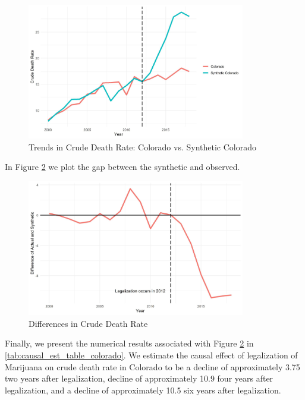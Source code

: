 \documentclass{article}
\begin{document}
\begin{figure}[H]
	\begin{center}
		\includegraphics[width=0.85\textwidth]{trends_plot_colorado}
	\end{center}
	\caption{Trends in Crude Death Rate: Colorado vs. Synthetic Colorado}
	\label{fig:trends_plot_colorado}
\end{figure}

In Figure \ref{fig:diffs_plot_colorado} we plot the gap between the synthetic and observed.

\begin{figure}[H]
	\begin{center}
		\includegraphics[width=0.85\textwidth]{diffs_plot_colorado}
	\end{center}
	\caption{Differences in Crude Death Rate}
	\label{fig:diffs_plot_colorado}
\end{figure}

Finally, we present the numerical results associated with Figure \ref{fig:diffs_plot_colorado} in \ref{tab:causal_est_table_colorado}. We estimate the causal effect of legalization of Marijuana on crude death rate in Colorado to be a decline of approximately 3.75 two years after legalization, decline of approximately 10.9 four years after legalization, and a decline of approximately 10.5 six years after legalization.
\end{document}
